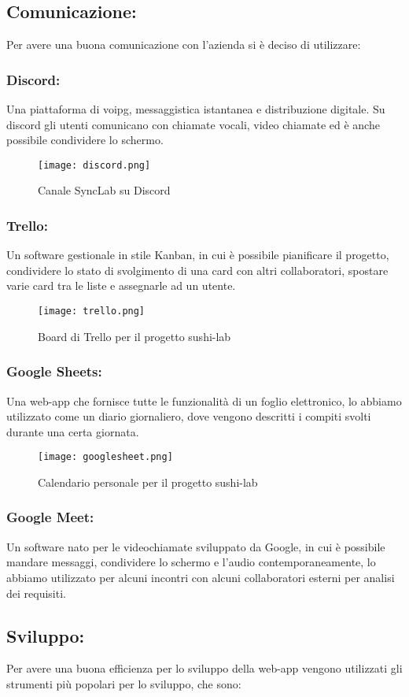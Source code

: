 \subsection{Comunicazione:}
Per avere una buona comunicazione con l'azienda si è deciso di utilizzare:
\subsubsection{Discord:}
Una piattaforma di \gls{voipg}, messaggistica istantanea e distribuzione digitale. Su discord gli utenti comunicano con chiamate vocali, video chiamate ed è anche possibile condividere lo schermo.
\begin{figure}[H]
    \centering
    \texttt{[image: discord.png]}
    \caption{Canale SyncLab su Discord}
\end{figure}
\subsubsection{Trello:}
Un software gestionale in stile Kanban, in cui è possibile pianificare il progetto, condividere lo stato di svolgimento di una card con altri collaboratori, spostare varie card tra le liste e assegnarle ad un utente.
\begin{figure}[H]
    \centering
    \texttt{[image: trello.png]}
    \caption{Board di Trello per il progetto sushi-lab}
\end{figure}
\subsubsection{Google Sheets:}
Una web-app che fornisce tutte le funzionalità di un foglio elettronico, lo abbiamo utilizzato come un diario giornaliero, dove vengono descritti i compiti svolti durante una certa giornata.
\begin{figure}[H]
    \centering
    \texttt{[image: googlesheet.png]}
    \caption{Calendario personale per il progetto sushi-lab}
\end{figure}
\subsubsection{Google Meet:}
Un software nato per le videochiamate sviluppato da Google, in cui è possibile mandare messaggi, condividere lo schermo e l'audio contemporaneamente, lo abbiamo utilizzato per alcuni incontri con alcuni collaboratori esterni per analisi dei requisiti.
\subsection{Sviluppo:}
Per avere una buona efficienza per lo sviluppo della web-app vengono utilizzati gli strumenti più popolari per lo sviluppo, che sono:
